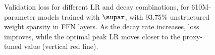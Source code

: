 \begin{figure}
  \centering
  \scalebox{0.4}{
    \texttt{[image: pdffigs/s=0.9375\_curves.617M.pdf]}
  }
  \mbox{}
  \vspace{-1mm}
  \mbox{}
  \caption{Validation loss for different LR and decay combinations,
    for 610M-parameter models trained with $\supar$, with 93.75\%
    unstructured weight sparsity in FFN layers.  As the decay rate
    increases, loss improves, while the optimal peak LR moves closer to
    the proxy-tuned value (vertical red
    line).\label{fig:maxlr_s=0.9375}}
\end{figure}
